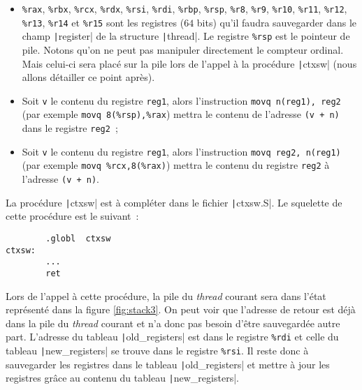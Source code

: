 \documentclass[a4paper]{article}
\begin{document}
\begin{itemize}

\item \verb+%rax+, \verb+%rbx+, \verb+%rcx+, \verb+%rdx+, \verb+%rsi+, \verb+%rdi+, \verb+%rbp+, \verb+%rsp+, \verb+%r8+,
\verb+%r9+, \verb+%r10+, \verb+%r11+, \verb+%r12+, \verb+%r13+, \verb+%r14+ et \verb+%r15+ sont
les registres ($64$ bits) qu'il faudra sauvegarder dans le champ \texttt|register| de la structure \texttt|thread|. Le registre \verb+%rsp+
est le pointeur de pile. Notons qu'on ne peut pas manipuler directement le compteur ordinal. Mais celui-ci sera placé sur la pile
lors de l'appel à la procédure \texttt|ctxsw| (nous allons détailler ce point après).
\item Soit \verb+v+ le contenu du registre \verb+reg1+, alors l'instruction \verb+movq n(reg1), reg2+ (par exemple \verb+movq 8(%rsp),%rax+)
mettra le contenu de l'adresse \verb#(v + n)# dans le registre \verb+reg2+~;
\item Soit \verb+v+ le contenu du registre \verb+reg1+, alors l'instruction \verb+movq reg2, n(reg1)+ (par exemple \verb+movq %rcx,8(%rax)+)
mettra le contenu du registre \verb+reg2+ à l'adresse \verb#(v + n)#.\\
\end{itemize} 

La procédure \texttt|ctxsw| est à compléter dans le fichier \texttt|ctxsw.S|. Le squelette de cette procédure est le suivant~:
\begin{verbatim}
        .globl  ctxsw
ctxsw:
        ...
        ret
\end{verbatim}

Lors de l'appel à cette procédure, la pile du \emph{thread} courant sera dans l'état représenté dans la figure \ref{fig:stack3}. On peut voir 
que l'adresse de retour est déjà dans la pile du \emph{thread} courant et n'a donc pas besoin d'être sauvegardée autre part. L'adresse du
tableau \texttt|old_registers| est dans le registre \verb+%rdi+ et celle du tableau \texttt|new_registers| se trouve dans le registre \verb+%rsi+. 
Il reste donc à sauvegarder les registres dans le tableau
\texttt|old_registers| et mettre à jour les registres grâce au contenu du tableau \texttt|new_registers|.\\
\end{document}
